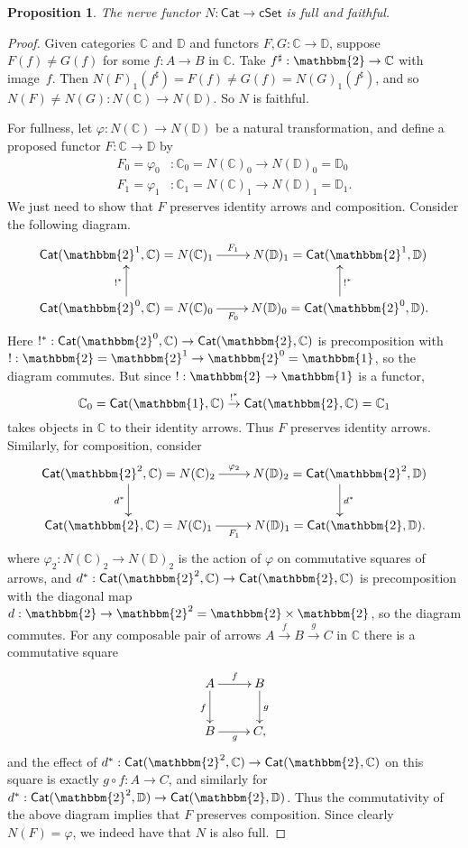 \documentclass[11pt]{amsart}
\newcommand{\bbtwo}{\ensuremath{\mathbbm{2}}}
\newcommand{\D}{\ensuremath{\mathbb{D}}}
\newcommand{\bbC}{\ensuremath{\mathbb{C}}}
\newcommand{\Cat}{\ensuremath{\mathsf{Cat}}}
\newcommand{\cSet}{\ensuremath{\mathsf{cSet}}}
\renewcommand{\to}{\ensuremath{\rightarrow}}
\newtheorem{proposition}[theorem]{Proposition}
\theoremstyle{remark}
\theoremstyle{definition}
\begin{document}
\begin{proposition}\label{prop:nervefull}
The nerve functor $N : \Cat \to \cSet$ is full and faithful.
\end{proposition}
\begin{proof}
Given categories $\bbC$ and $\D$ and functors $F, G : \bbC\to\D$, suppose $F(f) \neq G(f)$ for some $f : A\to B$ in $\bbC$.  Take $f^{\sharp} : \bbtwo \to \bbC$ with image~$f$.  Then $N(F)_1(f^\sharp) = F(f) \neq G(f) = N(G)_1(f^\sharp)$, and so $N(F) \neq N(G) : N(\bbC)\to N(\D)$.  So $N$ is faithful.

For fullness, let $\varphi : N(\bbC) \to N(\D)$ be a natural transformation, and define a proposed functor $F : \bbC\to \D$ by  
\begin{align*}
F_0 = \varphi_0 &: \bbC_0 = N(\bbC)_0 \to N(\D)_0 = \D_0\\
F_1 = \varphi_1 &: \bbC_1 = N(\bbC)_1 \to N(\D)_1 = \D_1.
 \end{align*}
We just need to show that $F$ preserves identity arrows and composition.
Consider the following diagram.
\[
\xymatrix{
\Cat(\bbtwo^1, \bbC) = N(\bbC)_1 \ar[r]^{F_1} & N(\D)_1 = \Cat(\bbtwo^1, \D) \\
\Cat(\bbtwo^0, \bbC) = N(\bbC)_0 \ar[u]^{!^*} \ar[r]_{F_0} & N(\D)_0 = \Cat(\bbtwo^0, \D) \ar[u]_{!^*}.
}
\]
Here $!^* : \Cat(\bbtwo^0, \bbC) \to \Cat(\bbtwo, \bbC) $ is precomposition with $! : \bbtwo = \bbtwo^1 \rightarrow \bbtwo^0 = \mathbbm{1}$, so the diagram commutes.  But since $! : \bbtwo \rightarrow \mathbbm{1}$ is a functor, $$\bbC_0 = \Cat(\mathbbm{1}, \bbC)  \stackrel{!^*}{\to}  \Cat(\bbtwo, \bbC) = \bbC_1$$ takes objects in $\bbC$ to their identity arrows.  Thus $F$ preserves identity arrows.  Similarly, for composition, consider 
\[
\xymatrix{
\Cat(\bbtwo^2, \bbC) = N(\bbC)_2 \ar[d]_{d^*} \ar[r]^{\varphi_2} & N(\D)_2 = \Cat(\bbtwo^2, \D) \ar[d]^{d^*} \\
\Cat(\bbtwo, \bbC) = N(\bbC)_1  \ar[r]_{F_1} & N(\D)_1 = \Cat(\bbtwo, \D).
}
\]
where $\varphi_2 : N(\bbC)_2 \to N(\D)_2$ is the action of $\varphi$ on commutative squares of arrows, and $d^* : \Cat(\bbtwo^2, \bbC) \to \Cat(\bbtwo, \bbC)$ is precomposition with the diagonal map $d : \bbtwo \rightarrow \bbtwo^2 = \bbtwo\times\bbtwo$, so the diagram commutes.  For any composable pair of arrows $A \stackrel{f}{\to} B \stackrel{g}{\to} C$ in $\bbC$ there is a commutative square 
\[
\xymatrix{
A \ar[r]^{f} \ar[d]_{f} & B \ar[d]^{g} \\
B  \ar[r]_{g} & C,
}
\]
and the effect of $d^* : \Cat(\bbtwo^2, \bbC) \to \Cat(\bbtwo, \bbC)$ on this square is exactly $g\circ f: A\to C$, and similarly for $d^* : \Cat(\bbtwo^2, \D) \to \Cat(\bbtwo, \D)$.  Thus the commutativity of the above diagram implies that $F$ preserves composition.
Since clearly $N(F) = \varphi$, we indeed have that $N$ is also full.
\end{proof}
\end{document}
